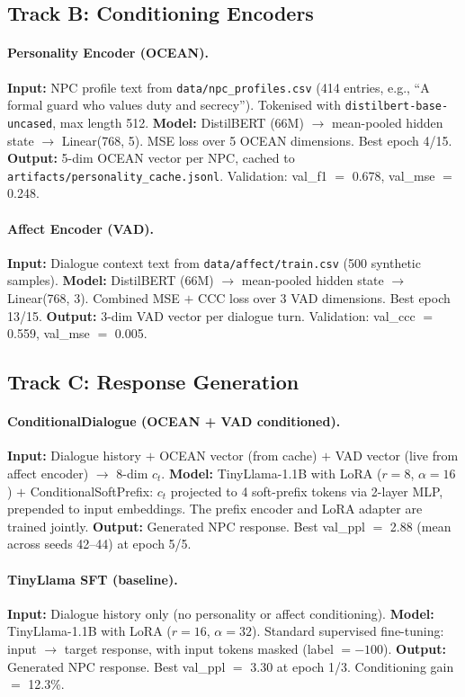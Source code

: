 \documentclass[11pt]{article}
\begin{document}
\subsection{Track B: Conditioning Encoders}

\paragraph{Personality Encoder (OCEAN).}
\textbf{Input:} NPC profile text from \texttt{data/npc\_profiles.csv} (414 entries, e.g., ``A formal guard who values duty and secrecy'').
Tokenised with \texttt{distilbert-base-uncased}, max length 512.
\textbf{Model:} DistilBERT (66M) $\rightarrow$ mean-pooled hidden state $\rightarrow$ Linear(768, 5).
MSE loss over 5 OCEAN dimensions.
Best epoch 4/15.
\textbf{Output:} 5-dim OCEAN vector per NPC, cached to \texttt{artifacts/personality\_cache.jsonl}.
Validation: val\_f1 $=$ 0.678, val\_mse $=$ 0.248.

\paragraph{Affect Encoder (VAD).}
\textbf{Input:} Dialogue context text from \texttt{data/affect/train.csv} (500 synthetic samples).
\textbf{Model:} DistilBERT (66M) $\rightarrow$ mean-pooled hidden state $\rightarrow$ Linear(768, 3).
Combined MSE $+$ CCC loss over 3 VAD dimensions.
Best epoch 13/15.
\textbf{Output:} 3-dim VAD vector per dialogue turn.
Validation: val\_ccc $=$ 0.559, val\_mse $=$ 0.005.

\subsection{Track C: Response Generation}

\paragraph{ConditionalDialogue (OCEAN + VAD conditioned).}
\textbf{Input:} Dialogue history $+$ OCEAN vector (from cache) $+$ VAD vector (live from affect encoder) $\rightarrow$ 8-dim $c_t$.
\textbf{Model:} TinyLlama-1.1B with LoRA ($r=8$, $\alpha=16$) $+$ ConditionalSoftPrefix: $c_t$ projected to 4 soft-prefix tokens via 2-layer MLP, prepended to input embeddings.
The prefix encoder and LoRA adapter are trained jointly.
\textbf{Output:} Generated NPC response.
Best val\_ppl $=$ 2.88 (mean across seeds 42--44) at epoch 5/5.

\paragraph{TinyLlama SFT (baseline).}
\textbf{Input:} Dialogue history only (no personality or affect conditioning).
\textbf{Model:} TinyLlama-1.1B with LoRA ($r=16$, $\alpha=32$). Standard supervised fine-tuning: input $\rightarrow$ target response, with input tokens masked (label $=-100$).
\textbf{Output:} Generated NPC response.
Best val\_ppl $=$ 3.30 at epoch 1/3.
Conditioning gain $=$ 12.3\%.
\end{document}
